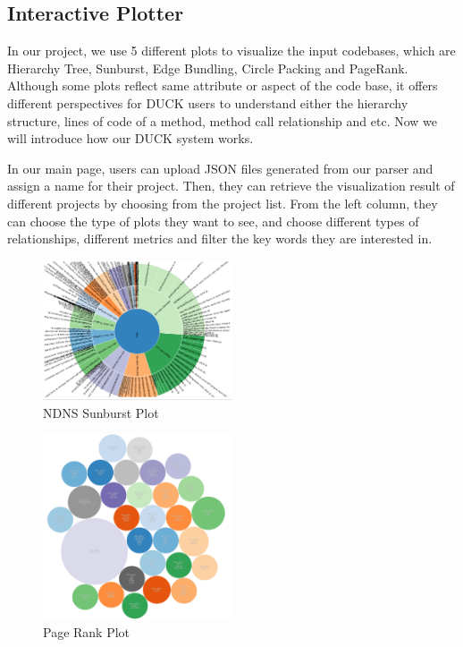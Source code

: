 \documentclass{sig-alternate}
\begin{document}
\subsection{Interactive Plotter}

In our project, we use 5 different plots to visualize the input codebases, which are Hierarchy Tree, Sunburst, Edge Bundling, Circle Packing and PageRank. Although some plots reflect same attribute or aspect of the code base, it offers different perspectives for DUCK users to understand either the hierarchy structure, lines of code of a method, method call relationship and etc. Now we will introduce how our DUCK system works.

In our main page, users can upload JSON files generated from our parser and assign a name for their project. Then, they can retrieve the visualization result of different projects by choosing from the project list. From the left column, they can choose the type of plots they want to see, and choose different types of relationships, different metrics and filter the key words they are interested in. 


\begin{figure}
\centering
\includegraphics[width=0.5\textwidth]{ndns-sunburst.png}
\caption{NDNS Sunburst Plot}
\label{fig:ndns-suburst}
\end{figure}

\begin{figure}
\centering
\includegraphics[width=0.5\textwidth]{pagerank.png}
\caption{Page Rank Plot}
\label{fig:pagerank}
\end{figure}
\end{document}
